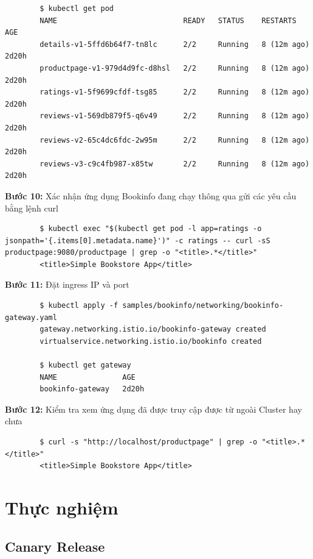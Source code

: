 \documentclass[12pt,a4paper]{report}
\begin{document}
{{\begin{lstlisting}
		$ kubectl get pod
		NAME                             READY   STATUS    RESTARTS      AGE
		details-v1-5ffd6b64f7-tn8lc      2/2     Running   8 (12m ago)   2d20h
		productpage-v1-979d4d9fc-d8hsl   2/2     Running   8 (12m ago)   2d20h
		ratings-v1-5f9699cfdf-tsg85      2/2     Running   8 (12m ago)   2d20h
		reviews-v1-569db879f5-q6v49      2/2     Running   8 (12m ago)   2d20h
		reviews-v2-65c4dc6fdc-2w95m      2/2     Running   8 (12m ago)   2d20h
		reviews-v3-c9c4fb987-x85tw       2/2     Running   8 (12m ago)   2d20h
	\end{lstlisting}
	\textbf{Bước 10:} Xác nhận ứng dụng Bookinfo đang chạy thông qua gửi các yêu cầu bằng lệnh {\color{red}curl} 
	\begin{lstlisting}
		$ kubectl exec "$(kubectl get pod -l app=ratings -o jsonpath='{.items[0].metadata.name}')" -c ratings -- curl -sS productpage:9080/productpage | grep -o "<title>.*</title>"
		<title>Simple Bookstore App</title>
	\end{lstlisting}
	\textbf{Bước 11:} Đặt ingress IP và port
	\begin{lstlisting}
		$ kubectl apply -f samples/bookinfo/networking/bookinfo-gateway.yaml
		gateway.networking.istio.io/bookinfo-gateway created
		virtualservice.networking.istio.io/bookinfo created
		
		$ kubectl get gateway
		NAME               AGE
		bookinfo-gateway   2d20h
	\end{lstlisting}
	\textbf{Bước 12:} Kiểm tra xem ứng dụng đã được truy cập được từ ngoài Cluster hay chưa
	\begin{lstlisting}
		$ curl -s "http://localhost/productpage" | grep -o "<title>.*</title>"
		<title>Simple Bookstore App</title>
	\end{lstlisting}
	\section{Thực nghiệm}
			\subsection{Canary Release}
}}
\end{document}
